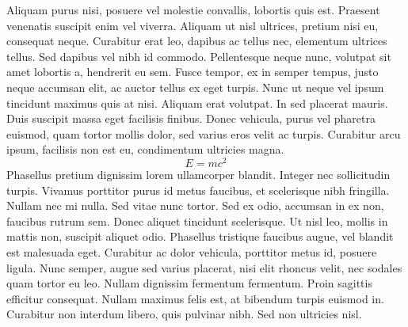 \documentclass[11pt]{article}
\begin{document}
Aliquam purus nisi, posuere vel molestie convallis, lobortis quis est. Praesent
venenatis suscipit enim vel viverra. Aliquam ut nisl ultrices, pretium nisi eu,
consequat neque. Curabitur erat leo, dapibus ac tellus nec, elementum ultrices
tellus. Sed dapibus vel nibh id commodo. Pellentesque neque nunc, volutpat sit
amet lobortis a, hendrerit eu sem. Fusce tempor, ex in semper tempus, justo
neque accumsan elit, ac auctor tellus ex eget turpis. Nunc ut neque vel ipsum
tincidunt maximus quis at nisi. Aliquam erat volutpat. In sed placerat mauris.
Duis suscipit massa eget facilisis finibus. Donec vehicula, purus vel pharetra
euismod, quam tortor mollis dolor, sed varius eros velit ac turpis. Curabitur
arcu ipsum, facilisis non est eu, condimentum ultricies magna.\[E=mc^{2}\] Phasellus pretium dignissim lorem ullamcorper blandit. Integer nec sollicitudin turpis. Vivamus porttitor purus id metus faucibus, et scelerisque nibh fringilla. Nullam nec mi nulla. Sed vitae nunc tortor. Sed ex odio, accumsan in ex non, faucibus rutrum sem. Donec aliquet tincidunt scelerisque. Ut nisl leo, mollis in mattis non, suscipit aliquet odio. Phasellus tristique faucibus augue, vel blandit est malesuada eget. Curabitur ac dolor vehicula, porttitor metus id, posuere ligula. Nunc semper, augue sed varius placerat, nisi elit rhoncus velit, nec sodales quam tortor eu leo. Nullam dignissim fermentum fermentum. Proin sagittis efficitur consequat. Nullam maximus felis est, at bibendum turpis euismod in. Curabitur non interdum libero, quis pulvinar nibh. Sed non ultricies nisl.
\end{document}
